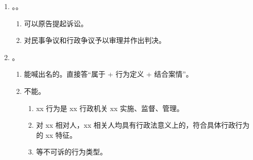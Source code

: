 \begin{enumerate}
\begin{enumerate}
\begin{enumerate}
                  \item {}。
                \end{enumerate}
          \item {}、审查程序 + 实体。
          \item 审查结果。。
                \begin{enumerate}
                  \item {}有前提，认为文件不合法。。
                  \item 法院。。
                  \item 只能不适用。。
                  \item {}。
                  \item 作出生效裁判的法院 3 个月内向  个月给答复。
                  \item {}。
                  \item 裁判生效后分别。省政府/国务院制定 \yjt 省高院/最高法。\sjt 结合宪法。联动审查。
                \end{enumerate}
        \end{enumerate}
  \item {}。。
        \begin{enumerate}
          \item 可以原告提起诉讼。
          \item 对民事争议和行政争议予以审理并作出判决。
        \end{enumerate}
  \item {}。
        \begin{enumerate}
          \item 能喊出名的。直接答“属于 + 行为定义 + 结合案情”。
          \item 不能。
                \begin{enumerate}
                  \item xx 行为是 xx 行政机关 xx 实施、监督、管理。
                  \item 对 xx 相对人，xx 相关人均具有行政法意义上的，符合具体行政行为的 xx 特征。
                  \item {}等不可诉的行为类型。
                \end{enumerate}
        \end{enumerate}
\end{enumerate}

